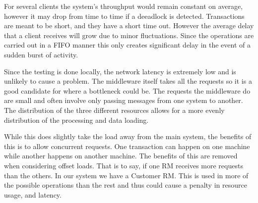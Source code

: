 \documentclass[12pt]{article}
\theoremstyle{plain}%
\theoremstyle{definition}
\theoremstyle{remark}
\begin{document}
For several clients the system's throughput would remain constant on average, however it may drop from time to time if a deeadlock is detected. Transactions are meant to be short, and they have a short time out. However the average delay that a client receives will grow due to minor fluctuations. Since the operations are carried out in a FIFO manner this only creates significant delay in the event of a sudden burst of activity. 

Since the testing is done locally, the network latency is extremely low and is unlikely to cause a problem. The middleware itself takes all the requests so it is a good candidate for where a bottleneck could be. The requests the middleware do are small and often involve only passing messages from one system to another. The distribution of the three different resources allows for a more evenly distribution of the processing and data loading. 

While this does slightly take the load away from the main system, the benefits of this is to allow concurrent requests. One transaction can happen on one machine while another happens on another machine. The benefits of this are removed when considering offset loads. That is to say, if one RM receives more requests than the others. In our system we have a Customer RM. This is used in more of the possible operations than the rest and thus could cause a penalty in resource usage, and latency.  
\end{document}
